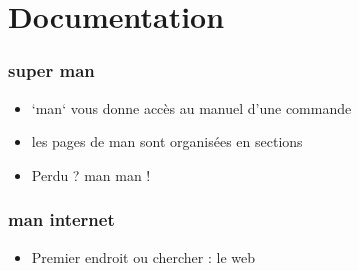 \section{Documentation}

\begin{frame}
    \frametitle{super man}
    \begin{itemize}
	    \item `man` vous donne accès au manuel d'une commande
	    \item les pages de man sont organisées en sections
            \item Perdu ? man man !
    \end{itemize}
\end{frame}

\begin{frame}
    \frametitle{man internet}
    \begin{itemize}
	\item Premier endroit ou chercher : le web
    \end{itemize}
\end{frame}

